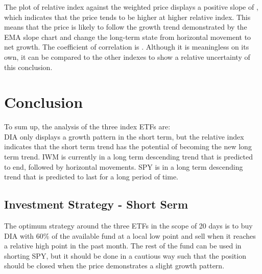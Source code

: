 \documentclass{article}
\begin{document}
\begin{center}
\end{center}

The plot of relative index against the weighted price displays a positive slope of   , which indicates that the price tends to be higher at higher relative index. This means that the price is likely to follow the growth trend demonstrated by the EMA slope chart and change the long-term state from horizontal movement to net growth. The coefficient of correlation is    . Although it is meaningless on its own, it can be compared to the other indexes to show a relative uncertainty of this conclusion.






\pagebreak
\section{Conclusion}
To sum up, the analysis of the three index ETFs are: \\
DIA only displays a growth pattern in the short term, but the relative index indicates that the short term trend has the potential of becoming the new long term trend. IWM is currently in a long term descending trend that is predicted to end, followed by horizontal movements. SPY is in a long term descending trend that is predicted to last for a long period of time. 

\subsection{Investment Strategy - Short Serm}
The optimum strategy around the three ETFs in the scope of 20 days is to buy DIA with $60\%$ of the available fund at a local low point and sell when it reaches a relative high point in the past month. The rest of the fund can be used in shorting SPY, but it should be done in a cautious way such that the position should be closed when the price demonstrates a slight growth pattern.
\end{document}

